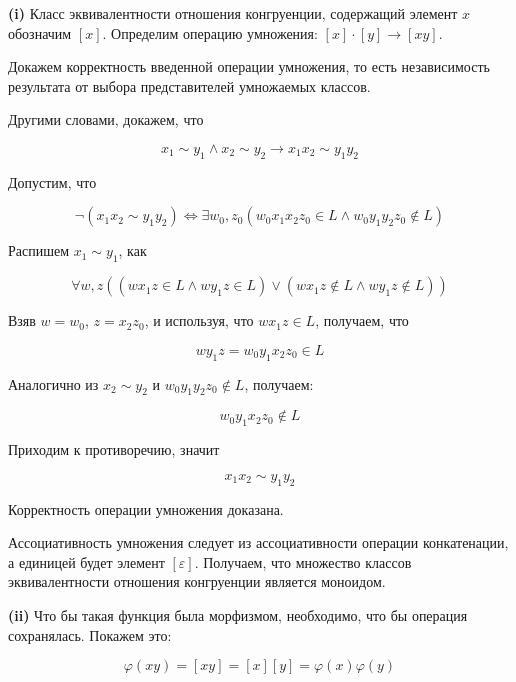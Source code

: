 \documentclass[10pt]{article}
\let \eps \varepsilon
\begin{document}
{\bf (i)}
Класс эквивалентности отношения конгруенции, содержащий элемент $x$ обозначим $[x]$.
Определим операцию умножения: $[x] \cdot [y] \rightarrow [xy]$.

Докажем корректность введенной операции умножения, то есть независимость результата от выбора представителей умножаемых классов.

Другими словами, докажем, что

$$x_1 \sim y_1 \wedge x_2 \sim y_2 \rightarrow x_1 x_2 \sim y_1 y_2$$  

Допустим, что

$$\neg (x_1 x_2 \sim y_1 y_2) \Leftrightarrow \exists w_0, z_0 ( w_0 x_1 x_2 z_0 \in L \wedge w_0 y_1 y_2 z_0 \notin L )$$

Распишем $x_1 \sim y_1$, как

$$\forall w, z ((w x_1 z \in L \wedge w y_1 z \in L) \vee (w x_1 z \notin L \wedge w y_1 z \notin L))$$

Взяв $w = w_0$, $z = x_2 z_0$, и используя, что $w x_1 z \in L$, получаем, что

$$w y_1 z = w_0 y_1 x_2 z_0 \in L$$

Аналогично из $x_2 \sim y_2$ и $w_0 y_1 y_2 z_0 \notin L$, получаем:

$$w_0 y_1 x_2 z_0 \notin L$$

Приходим к противоречию, значит

$$x_1 x_2 \sim y_1 y_2$$

Корректность операции умножения доказана.

Ассоциативность умножения следует из ассоциативности операции конкатенации, а единицей будет элемент $[\eps]$. Получаем, что множество классов эквивалентности отношения конгруенции является моноидом.

\smallskip

{\bf (ii)}
Что бы такая функция была морфизмом, необходимо, что бы операция сохранялась.
Покажем это:

$$\varphi(x y) = [x y] = [x] [y] = \varphi(x) \varphi(y)$$
\end{document}
